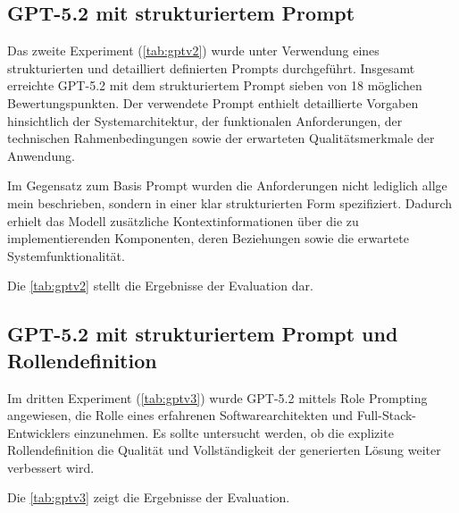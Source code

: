 \subsection{GPT-5.2 mit strukturiertem Prompt}
Das zweite Experiment (\ref{tab:gptv2}) wurde unter Verwendung eines strukturierten und detailliert definierten Prompts durchgeführt.
Insgesamt erreichte GPT-5.2 mit dem strukturiertem Prompt sieben von 18 möglichen Bewertungspunkten.
Der verwendete Prompt enthielt detaillierte
Vorgaben hinsichtlich der Systemarchitektur, der funktionalen Anforderungen, 
der technischen Rahmenbedingungen sowie der erwarteten Qualitätsmerkmale der Anwendung.

Im Gegensatz zum Basis Prompt wurden die Anforderungen nicht lediglich allge
mein beschrieben, sondern in einer klar strukturierten Form spezifiziert.
Dadurch erhielt das Modell zusätzliche Kontextinformationen über die zu implementierenden
Komponenten, deren Beziehungen sowie die erwartete Systemfunktionalität.

Die \ref{tab:gptv2} stellt die Ergebnisse der Evaluation dar.
\subsection{GPT-5.2 mit strukturiertem Prompt und Rollendefinition}

Im dritten Experiment (\ref{tab:gptv3}) wurde GPT-5.2 mittels Role Prompting angewiesen, die Rolle eines erfahrenen Softwarearchitekten und Full-Stack-Entwicklers einzunehmen. Es sollte untersucht werden, ob die explizite Rollendefinition die Qualität und Vollständigkeit der generierten Lösung weiter verbessert wird.

Die \ref{tab:gptv3} zeigt die Ergebnisse der Evaluation.


